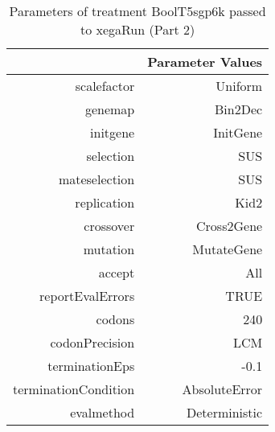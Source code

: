 \begin{table}[ht]
\centering
\begin{tabular}{rr}
  \hline
 & Parameter Values \\ 
  \hline
scalefactor & Uniform \\ 
  genemap & Bin2Dec \\ 
  initgene & InitGene \\ 
  selection & SUS \\ 
  mateselection & SUS \\ 
  replication & Kid2 \\ 
  crossover & Cross2Gene \\ 
  mutation & MutateGene \\ 
  accept & All \\ 
  reportEvalErrors & TRUE \\ 
  codons & 240 \\ 
  codonPrecision & LCM \\ 
  terminationEps & -0.1 \\ 
  terminationCondition & AbsoluteError \\ 
  evalmethod & Deterministic \\ 
   \hline
\end{tabular}
\caption{ Parameters of treatment BoolT5sgp6k passed to xegaRun
 (Part 2)} 
\end{table}
